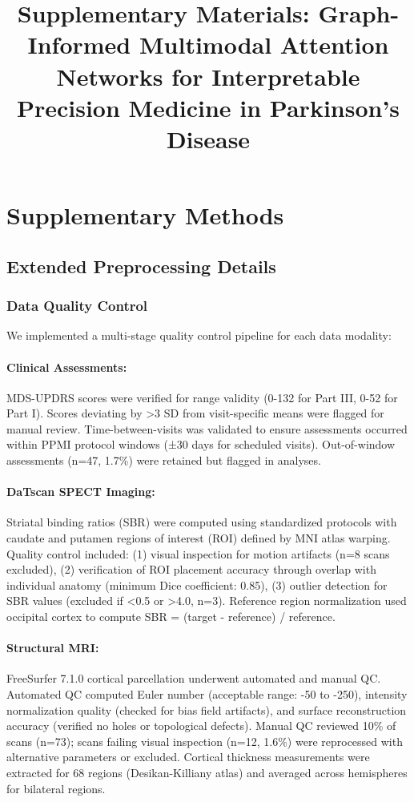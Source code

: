 \documentclass[11pt]{article}
\title{Supplementary Materials: Graph-Informed Multimodal Attention Networks for Interpretable Precision Medicine in Parkinson's Disease}
\begin{document}
\maketitle

\tableofcontents
\newpage

\section{Supplementary Methods}

\subsection{Extended Preprocessing Details}

\subsubsection{Data Quality Control}
We implemented a multi-stage quality control pipeline for each data modality:

\paragraph{Clinical Assessments:} MDS-UPDRS scores were verified for range validity (0-132 for Part III, 0-52 for Part I). Scores deviating by >3 SD from visit-specific means were flagged for manual review. Time-between-visits was validated to ensure assessments occurred within PPMI protocol windows (±30 days for scheduled visits). Out-of-window assessments (n=47, 1.7\%) were retained but flagged in analyses.

\paragraph{DaTscan SPECT Imaging:} Striatal binding ratios (SBR) were computed using standardized protocols with caudate and putamen regions of interest (ROI) defined by MNI atlas warping. Quality control included: (1) visual inspection for motion artifacts (n=8 scans excluded), (2) verification of ROI placement accuracy through overlap with individual anatomy (minimum Dice coefficient: 0.85), (3) outlier detection for SBR values (excluded if <0.5 or >4.0, n=3). Reference region normalization used occipital cortex to compute SBR = (target - reference) / reference.

\paragraph{Structural MRI:} FreeSurfer 7.1.0 cortical parcellation underwent automated and manual QC. Automated QC computed Euler number (acceptable range: -50 to -250), intensity normalization quality (checked for bias field artifacts), and surface reconstruction accuracy (verified no holes or topological defects). Manual QC reviewed 10\% of scans (n=73); scans failing visual inspection (n=12, 1.6\%) were reprocessed with alternative parameters or excluded. Cortical thickness measurements were extracted for 68 regions (Desikan-Killiany atlas) and averaged across hemispheres for bilateral regions.
\end{document}
